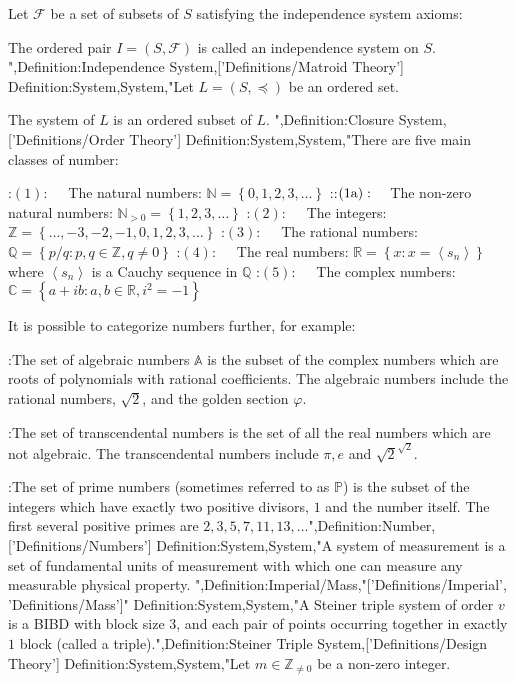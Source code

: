 Let $\mathscr F$ be a set of subsets of $S$ satisfying the independence system axioms:


The ordered pair $I = \left( S, \mathscr F \right)$ is called an independence system on $S$.
",Definition:Independence System,['Definitions/Matroid Theory']
Definition:System,System,"Let $L = \left({S, \preceq}\right)$ be an ordered set.


The system of $L$ is an ordered subset of $L$.
",Definition:Closure System,['Definitions/Order Theory']
Definition:System,System,"There are five main classes of number:

:$(1): \quad$ The natural numbers: $\mathbb N = \left\lbrace 0, 1, 2, 3, \ldots \right\rbrace$
::$(1 \text a): \quad$ The non-zero natural numbers: $\mathbb N_{>0} = \left\lbrace 1, 2, 3, \ldots \right\rbrace$
:$(2): \quad$ The integers: $\mathbb Z = \left\lbrace \ldots, -3, -2, -1, 0, 1, 2, 3, \ldots \right\rbrace$
:$(3): \quad$ The rational numbers: $\mathbb Q = \left\lbrace p / q: p, q \in \mathbb Z, q \ne 0 \right\rbrace$
:$(4): \quad$ The real numbers: $\mathbb R = \left\lbrace x: x = \left\langle s_n \right\rangle  \right\rbrace$ where $\left\langle s_n \right\rangle$ is a Cauchy sequence in $\mathbb Q$
:$(5): \quad$ The complex numbers: $\mathbb C = \left\lbrace a + i b: a, b \in \mathbb R, i^2 = -1 \right\rbrace$


It is possible to categorize numbers further, for example:

:The set of algebraic numbers $\mathbb A$ is the subset of the complex numbers which are roots of polynomials with rational coefficients.  The algebraic numbers include the rational numbers, $\sqrt 2$, and the golden section $\varphi$.

:The set of transcendental numbers is the set of all the real numbers which are not algebraic.  The transcendental numbers include $\pi, e$ and $\sqrt 2^{\sqrt 2}$.

:The set of prime numbers (sometimes referred to as $\mathbb P$) is the subset of the integers which have exactly two positive divisors, $1$ and the number itself.  The first several positive primes are $2, 3, 5, 7, 11, 13, \ldots$",Definition:Number,['Definitions/Numbers']
Definition:System,System,"A system of measurement is a set of fundamental units of measurement with which one can measure any measurable physical property.
",Definition:Imperial/Mass,"['Definitions/Imperial', 'Definitions/Mass']"
Definition:System,System,"A Steiner triple system of order $v$ is a BIBD with block size $3$, and each pair of points occurring together in exactly $1$ block (called a triple).",Definition:Steiner Triple System,['Definitions/Design Theory']
Definition:System,System,"Let $m \in \mathbb Z_{\ne 0}$ be a non-zero integer.


